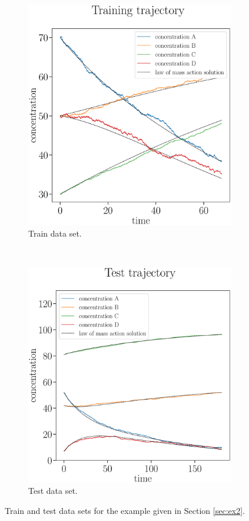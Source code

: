 \documentclass[oneside, abstracton, titlepage]{scrartcl}
\begin{document}
	\begin{figure}
		\centering
		\begin{subfigure}[b]{.45\textwidth}
			\includegraphics[width=\textwidth]{./figures_tex/cv_concentrations_train}
			\caption{Train data set.}
		\end{subfigure}
		~
		\begin{subfigure}[b]{.45\textwidth}
			\includegraphics[width=\textwidth]{./figures_tex/cv_concentrations_test}
			\caption{Test data set.}
		\end{subfigure}
		\caption{Train and test data sets for the example given in Section \ref{sec:ex2}.}
		\label{ex2:test-train-concentration-curves}
	\end{figure}
\end{document}
